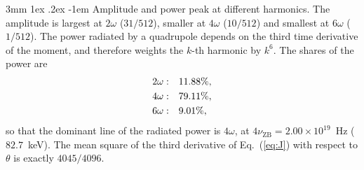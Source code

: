\documentclass[%
 reprint, amsmath,amssymb, aps, prb, ]{revtex4-2}
\makeatletter
\numberwithin{equation}{section}
\renewcommand\paragraph{%
  \@startsection{paragraph}{4}{\z@}%
    {3mm \@plus 1ex \@minus .2ex}%
    {-1em}%
    {\normalfont\normalsize\itshape}}
\makeatother
\begin{document}
\paragraph{Amplitude and power peak at different harmonics.} The amplitude is largest at $2\omega$ ($31/512$), smaller at $4\omega$ ($10/512$) and smallest at $6\omega$ ($1/512$). The power radiated by a quadrupole depends on the third time derivative of the moment, and therefore weights the $k$-th harmonic by $k^6$. The shares of the power are
\begin{align}
2\omega:&\quad 11.88\%,
\notag\\
4\omega:&\quad 79.11\%,
\notag\\
6\omega:&\quad 9.01\%,
\label{eq:shares}
\end{align}
so that the dominant line of the radiated power is $4\omega$, at $4\nu_{\text{ZB}} = 2.00\times10^{19}$~Hz ($82.7$~keV). The mean square of the third derivative of Eq.~(\ref{eq:J}) with respect to $\theta$ is exactly $4045/4096$.
\end{document}
